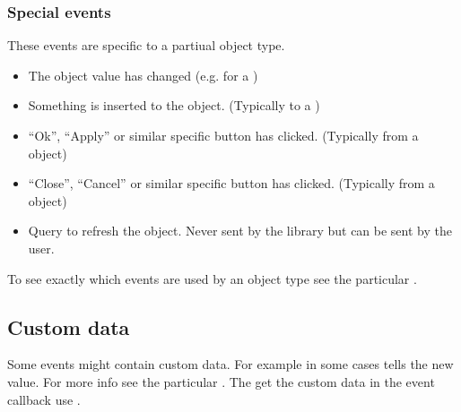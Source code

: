 \documentclass[letterpaper,10pt,english]{sphinxmanual}
\begin{document}
\subsubsection{Special events}
\label{\detokenize{overview/events:special-events}}
These events are specific to a partiual object type.
\begin{itemize}
\item {} 
 The object value has changed (e.g. for a {\hyperref[\detokenize{object-types/slider::doc}]{}})

\item {} 
 Something is inserted to the object. (Typically to a {\hyperref[\detokenize{object-types/ta::doc}]{}})

\item {} 
  “Ok”, “Apply” or similar specific button has clicked. (Typically from a {\hyperref[\detokenize{object-types/kb::doc}]{}} object)

\item {} 
 “Close”, “Cancel” or similar specific button has clicked. (Typically from a {\hyperref[\detokenize{object-types/kb::doc}]{}} object)

\item {} 
 Query to refresh the object. Never sent by the library but can be sent by the user.

\end{itemize}

To see exactly which events are used by an object type see the particular {\hyperref[\detokenize{object-types/index::doc}]{}}.


\subsection{Custom data}
\label{\detokenize{overview/events:custom-data}}
Some events might contain custom data. For example  in some cases tells the new value. For more info see the particular {\hyperref[\detokenize{object-types/index::doc}]{}}.
The get the custom data in the event callback use .
\end{document}
